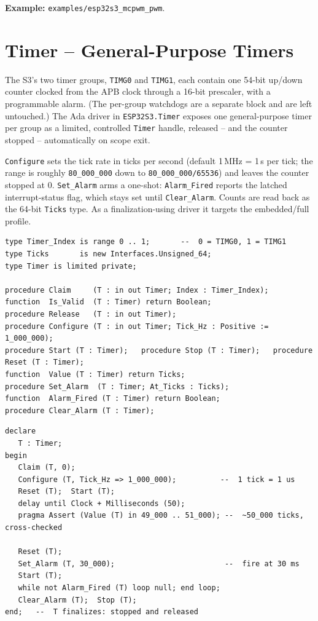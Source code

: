 \noindent\textbf{Example:} \texttt{examples/esp32s3\_mcpwm\_pwm}.

\section{Timer -- General-Purpose Timers}
\label{app:int:timer}

The S3's two timer groups, \texttt{TIMG0} and \texttt{TIMG1}, each contain one
54-bit up/down counter clocked from the APB clock through a 16-bit prescaler,
with a programmable alarm. (The per-group watchdogs are a separate block and are
left untouched.) The Ada driver in \texttt{ESP32S3.Timer} exposes one
general-purpose timer per group as a limited, controlled \texttt{Timer} handle,
released -- and the counter stopped -- automatically on scope exit.

\texttt{Configure} sets the tick rate in ticks per second (default 1\,MHz =
1\,\textmu{}s per tick; the range is roughly \texttt{80\_000\_000} down to
\texttt{80\_000\_000/65536}) and leaves the counter stopped at 0.
\texttt{Set\_Alarm} arms a one-shot: \texttt{Alarm\_Fired} reports the latched
interrupt-status flag, which stays set until \texttt{Clear\_Alarm}. Counts are
read back as the 64-bit \texttt{Ticks} type. As a finalization-using driver it
targets the embedded/full profile.

\begin{lstlisting}
type Timer_Index is range 0 .. 1;       --  0 = TIMG0, 1 = TIMG1
type Ticks       is new Interfaces.Unsigned_64;
type Timer is limited private;

procedure Claim     (T : in out Timer; Index : Timer_Index);
function  Is_Valid  (T : Timer) return Boolean;
procedure Release   (T : in out Timer);
procedure Configure (T : in out Timer; Tick_Hz : Positive := 1_000_000);
procedure Start (T : Timer);   procedure Stop (T : Timer);   procedure Reset (T : Timer);
function  Value (T : Timer) return Ticks;
procedure Set_Alarm  (T : Timer; At_Ticks : Ticks);
function  Alarm_Fired (T : Timer) return Boolean;
procedure Clear_Alarm (T : Timer);
\end{lstlisting}

\begin{lstlisting}
declare
   T : Timer;
begin
   Claim (T, 0);
   Configure (T, Tick_Hz => 1_000_000);          --  1 tick = 1 us
   Reset (T);  Start (T);
   delay until Clock + Milliseconds (50);
   pragma Assert (Value (T) in 49_000 .. 51_000); --  ~50_000 ticks, cross-checked

   Reset (T);
   Set_Alarm (T, 30_000);                         --  fire at 30 ms
   Start (T);
   while not Alarm_Fired (T) loop null; end loop;
   Clear_Alarm (T);  Stop (T);
end;   --  T finalizes: stopped and released
\end{lstlisting}

